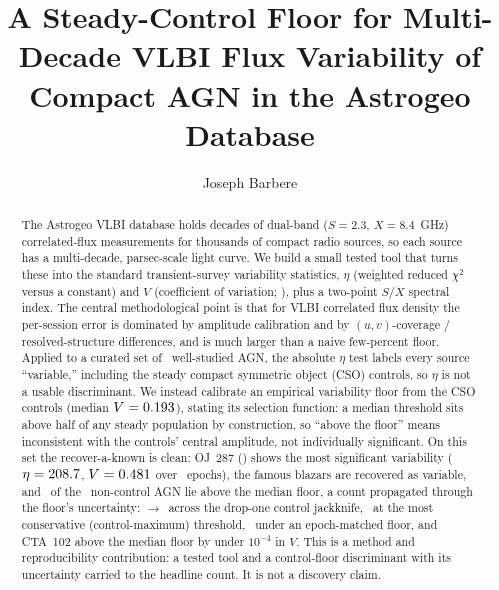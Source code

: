 \documentclass[twocolumn]{aastex631}
\begin{document}
\title{A Steady-Control Floor for Multi-Decade VLBI Flux Variability of Compact AGN in
the Astrogeo Database}

\author[0009-0008-3289-4447]{Joseph Barbere}

\begin{abstract}
The Astrogeo VLBI database holds decades of dual-band ($S=2.3$, $X=8.4$~GHz) correlated-flux
measurements for thousands of compact radio sources, so each source has a multi-decade, parsec-scale
light curve. We build a small tested tool that turns these into the standard transient-survey
variability statistics, $\eta$ (weighted reduced $\chi^2$ versus a constant) and $V$ (coefficient of
variation; \citealt{scheers2011,swinbank2015,rowlinson2019}), plus a two-point $S/X$ spectral index. The
central methodological point is that for VLBI correlated flux density the per-session error is
dominated by amplitude calibration and by $(u,v)$-coverage / resolved-structure differences, and is
much larger than a naive few-percent floor. Applied to a curated set of \viN\ well-studied AGN, the absolute $\eta$ test labels every source
``variable,'' including the steady compact symmetric object (CSO) controls, so $\eta$ is not a usable
discriminant. We instead calibrate an empirical variability floor from the CSO controls (median
$V=0.193$), stating its selection function: a median threshold sits above half of any steady
population by construction, so ``above the floor'' means inconsistent with the controls' central
amplitude, not individually significant. On this set the recover-a-known is clean: OJ~287
(\viTopName) shows the most significant variability ($\eta=208.7$, $V=0.481$ over
\viTopEpochs\ epochs), the
famous blazars are recovered as variable, and \viNabove\ of the \viNnoncontrol\ non-control AGN lie above the median floor, a count propagated through the floor's uncertainty: \viNaboveJkHi$\to$\viNaboveJkLo\
across the drop-one control jackknife, \viNaboveCtrlMax\ at the most conservative (control-maximum)
threshold, \viNaboveEpochMatched\ under an epoch-matched floor, and CTA~102 above the median floor
by under $10^{-4}$ in $V$. This is a method and reproducibility contribution: a
tested tool and a control-floor discriminant with its uncertainty carried to the headline count. It
is not a discovery claim.
\end{abstract}

\end{document}

